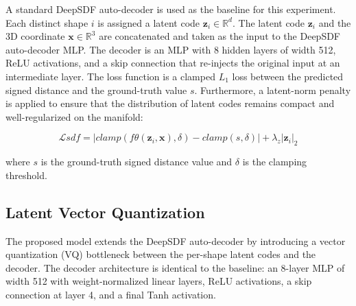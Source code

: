 \documentclass[11pt, a4paper]{article}
\begin{document}
A standard DeepSDF auto-decoder is used as the baseline for this experiment. Each distinct shape $i$ is assigned a latent code $\mathbf{z}_i \in \mathbb{R}^d$. The latent code $\mathbf{z}_i$ and the 3D coordinate $\mathbf{x} \in \mathbb{R}^3$ are concatenated and taken as the input to the DeepSDF auto-decoder MLP. The decoder is an MLP with 8 hidden layers of width 512, ReLU activations, and a skip connection that re-injects the original input at an intermediate layer. The loss function is a clamped $L_1$ loss between the predicted signed distance and the ground-truth value $s$. Furthermore, a latent-norm penalty is applied to ensure that the distribution of latent codes remains compact and well-regularized on the manifold: 

\begin{equation}
    \mathcal{L}{sdf} = |clamp(f\theta(\mathbf{z}_i, \mathbf{x}), \delta) - clamp(s, \delta)| + \lambda_z |\mathbf{z}_i|_2
\end{equation}

where $s$ is the ground-truth signed distance value and $\delta$ is the clamping threshold.

\subsection{Latent Vector Quantization}

The proposed model extends the DeepSDF auto-decoder by introducing a vector quantization (VQ) bottleneck between the per-shape latent codes and the decoder. The decoder architecture is identical to the baseline: an 8-layer MLP of width 512 with weight-normalized linear layers, ReLU activations, a skip connection at layer 4, and a final Tanh activation.
\end{document}
